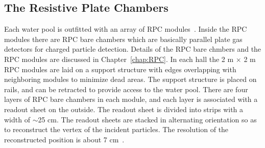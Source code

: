 \subsection{The Resistive Plate Chambers}

Each water pool is outfitted with an array of RPC modules~\cite{Xu2011}. Inside the RPC modules there are RPC bare chambers which are basically parallel plate gas detectors for charged particle detection. Details of the RPC bare chmbers and the RPC modules are discussed in Chapter~\ref{chap:RPC}. In each hall the 2 m $\times$ 2 m RPC modules are laid on a support structure with edges overlapping with neighboring modules to minimize dead areas. The support structure is placed on rails, and can be retracted to provide access to the water pool. There are four layers of RPC bare chambers in each module, and each layer is associated with a readout sheet on the outside. The readout sheet is divided into strips with a width of $\sim$25 cm. The readout sheets are stacked in alternating orientation so as to reconstruct the vertex of the incident particles. The resolution of the reconstructed position is about 7 cm~\cite{Ning2013}.



%
%
